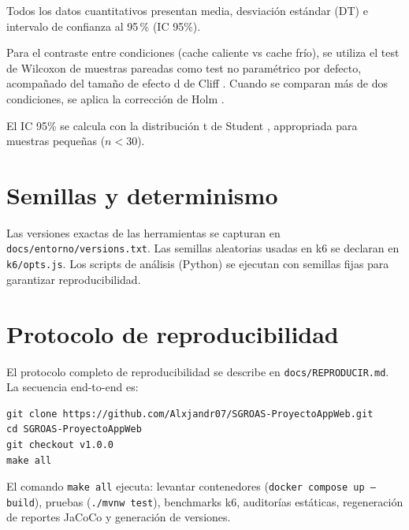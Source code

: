 Todos los datos cuantitativos presentan media, desviación estándar (DT) e intervalo de confianza al 95\,\% (IC 95\%).

Para el contraste entre condiciones (cache caliente vs cache frío), se utiliza el test de Wilcoxon de muestras pareadas \cite{wilcoxon1945} como test no paramétrico por defecto, acompañado del tamaño de efecto d de Cliff \cite{cliff1993}. Cuando se comparan más de dos condiciones, se aplica la corrección de Holm \cite{wohlin2012}.

El IC 95\% se calcula con la distribución t de Student \cite{student1908}, appropriada para muestras pequeñas ($n < 30$).

\section{Semillas y determinismo}
\label{sec:semillas}

Las versiones exactas de las herramientas se capturan en \texttt{docs/entorno/versions.txt}. Las semillas aleatorias usadas en k6 se declaran en \texttt{k6/opts.js}. Los scripts de análisis (Python) se ejecutan con semillas fijas para garantizar reproducibilidad.

\section{Protocolo de reproducibilidad}
\label{sec:reproducibilidad}

El protocolo completo de reproducibilidad se describe en \texttt{docs/REPRODUCIR.md}. La secuencia end-to-end es:

\begin{verbatim}
git clone https://github.com/Alxjandr07/SGROAS-ProyectoAppWeb.git
cd SGROAS-ProyectoAppWeb
git checkout v1.0.0
make all
\end{verbatim}

El comando \texttt{make all} ejecuta: levantar contenedores (\texttt{docker compose up --build}), pruebas (\texttt{./mvnw test}), benchmarks k6, auditorías estáticas, regeneración de reportes JaCoCo y generación de versiones.
